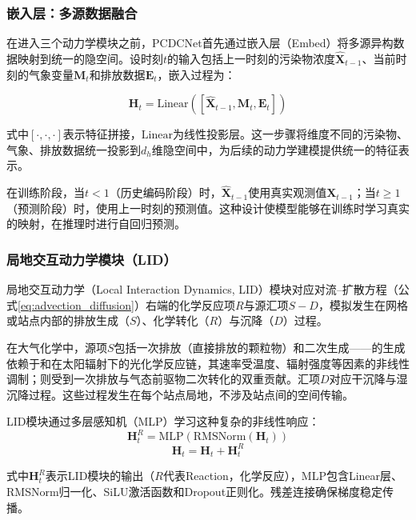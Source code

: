 \subsubsection{嵌入层：多源数据融合}
在进入三个动力学模块之前，PCDCNet首先通过嵌入层（Embed）将多源异构数据映射到统一的隐空间。设时刻$t$的输入包括上一时刻的污染物浓度$\hat{\mathbf{X}}_{t-1}$、当前时刻的气象变量$\mathbf{M}_t$和排放数据$\mathbf{E}_t$，嵌入过程为：

\begin{equation}
    \mathbf{H}_t = \text{Linear}([\hat{\mathbf{X}}_{t-1}, \mathbf{M}_t, \mathbf{E}_t])
\end{equation}

\noindent 式中$[\cdot, \cdot, \cdot]$表示特征拼接，$\text{Linear}$为线性投影层。这一步骤将维度不同的污染物、气象、排放数据统一投影到$d_h$维隐空间中，为后续的动力学建模提供统一的特征表示。

在训练阶段，当$t < 1$（历史编码阶段）时，$\hat{\mathbf{X}}_{t-1}$使用真实观测值$\mathbf{X}_{t-1}$；当$t \geq 1$（预测阶段）时，使用上一时刻的预测值。这种设计使模型能够在训练时学习真实的映射，在推理时进行自回归预测。


\subsubsection{局地交互动力学模块（LID）}
局地交互动力学（Local Interaction Dynamics, LID）模块对应对流--扩散方程（公式\eqref{eq:advection_diffusion}）右端的化学反应项$R$与源汇项$S - D$，模拟发生在网格或站点内部的排放生成（$S$）、化学转化（$R$）与沉降（$D$）过程。

在大气化学中，源项$S$包括一次排放（直接排放的颗粒物）和二次生成——\ozone 的生成依赖于\NOx 和\VOCs{}在太阳辐射下的光化学反应链，其速率受温度、辐射强度等因素的非线性调制；\PM 则受到一次排放与气态前驱物二次转化的双重贡献。汇项$D$对应干沉降与湿沉降过程。这些过程发生在每个站点局地，不涉及站点间的空间传输。

LID模块通过多层感知机（MLP）学习这种复杂的非线性响应：
\begin{equation}
    \mathbf{H}_t^R = \text{MLP}(\text{RMSNorm}(\mathbf{H}_t))
\end{equation}
\begin{equation}
    \mathbf{H}_t = \mathbf{H}_t + \mathbf{H}_t^R
\end{equation}

\noindent 式中$\mathbf{H}_t^R$表示LID模块的输出（$R$代表Reaction，化学反应），MLP包含Linear层、RMSNorm归一化\citep{zhang2019root}、SiLU激活函数和Dropout正则化。残差连接确保梯度稳定传播。

